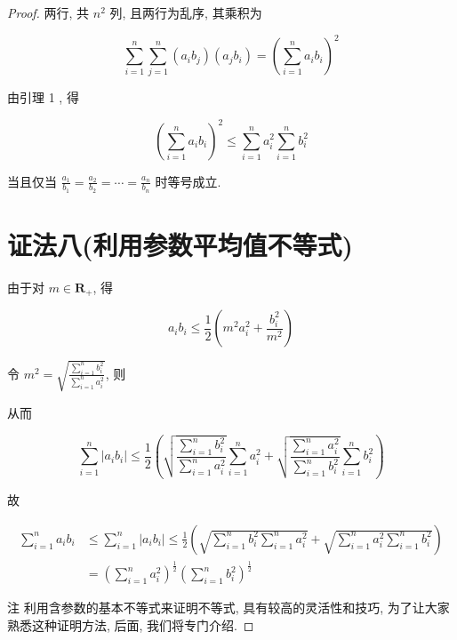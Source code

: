 \begin{proof}
	两行, 共 $n^{2}$ 列, 且两行为乱序, 其乘积为
	
	$$
	\sum_{i=1}^{n} \sum_{j=1}^{n}\left(a_{i} b_{j}\right)\left(a_{j} b_{i}\right)=\left(\sum_{i=1}^{n} a_{i} b_{i}\right)^{2}
	$$
	
	由引理 1 , 得
	
	$$
	\left(\sum_{i=1}^{n} a_{i} b_{i}\right)^{2} \leqslant \sum_{i=1}^{n} a_{i}^{2} \sum_{i=1}^{n} b_{i}^{2}
	$$
	
	当且仅当 $\frac{a_{1}}{b_{1}}=\frac{a_{2}}{b_{2}}=\cdots=\frac{a_{n}}{b_{n}}$ 时等号成立.
	
	\section*{证法八(利用参数平均值不等式)}
	由于对 $m \in \mathbf{R}_{+}$, 得
	
	$$
	a_{i} b_{i} \leqslant \frac{1}{2}\left(m^{2} a_{i}^{2}+\frac{b_{i}^{2}}{m^{2}}\right)
	$$
	
	令 $m^{2}=\sqrt{\frac{\sum_{i=1}^{n} b_{i}^{2}}{\sum_{i=1}^{n} a_{i}^{2}}}$, 则
	
	
	从而
	
	$$
	\sum_{i=1}^{n}\left|a_{i} b_{i}\right| \leqslant \frac{1}{2}\left(\sqrt{\frac{\sum_{i=1}^{n} b_{i}^{2}}{\sum_{i=1}^{n} a_{i}^{2}}} \sum_{i=1}^{n} a_{i}^{2}+\sqrt{\frac{\sum_{i=1}^{n} a_{i}^{2}}{\sum_{i=1}^{n} b_{i}^{2}}} \sum_{i=1}^{n} b_{i}^{2}\right)
	$$
	
	故
	
	$$
	\begin{aligned}
	\sum_{i=1}^{n} a_{i} b_{i} & \leqslant \sum_{i=1}^{n}\left|a_{i} b_{i}\right| \leqslant \frac{1}{2}\left(\sqrt{\sum_{i=1}^{n} b_{i}^{2} \sum_{i=1}^{n} a_{i}^{2}}+\sqrt{\sum_{i=1}^{n} a_{i}^{2} \sum_{i=1}^{n} b_{i}^{2}}\right) \\
	& =\left(\sum_{i=1}^{n} a_{i}^{2}\right)^{\frac{1}{2}}\left(\sum_{i=1}^{n} b_{i}^{2}\right)^{\frac{1}{2}}
	\end{aligned}
	$$
	
	注 利用含参数的基本不等式来证明不等式, 具有较高的灵活性和技巧, 为了让大家熟悉这种证明方法, 后面, 我们将专门介绍.
	

\end{proof}
